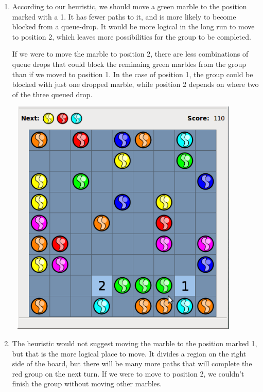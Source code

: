 \documentclass[a4paper,12pt]{article}
\begin{document}
\begin{enumerate}[1)]
\pagebreak
    
  \item

    According to our heuristic, we should move a green marble to the
    position marked with a 1. It has fewer paths to it, and is more
    likely to become blocked from a queue-drop. It would be more
    logical in the long run to move to position 2, which leaves more
    possibilities for the group to be completed.

    If we were to move the marble to position 2, there are less
    combinations of queue drops that could block the reminaing green
    marbles from the group than if we moved to position 1. In the case
    of position 1, the group could be blocked with just one dropped
    marble, while position 2 depends on where two of the three queued
    drop.

    \vspace{1in}
    
    \begin{center}
      \includegraphics[width=4.5in, height=4.5in, keepaspectratio=true]{image/case2.png}
    \end{center}

\pagebreak

  \item

    The heuristic would not suggest moving the marble to the position
    marked 1, but that is the more logical place to move. It divides a
    region on the right side of the board, but there will be many more
    paths that will complete the red group on the next turn. If we
    were to move to position 2, we couldn't finish the group without
    moving other marbles.


\end{enumerate}
\end{document}

